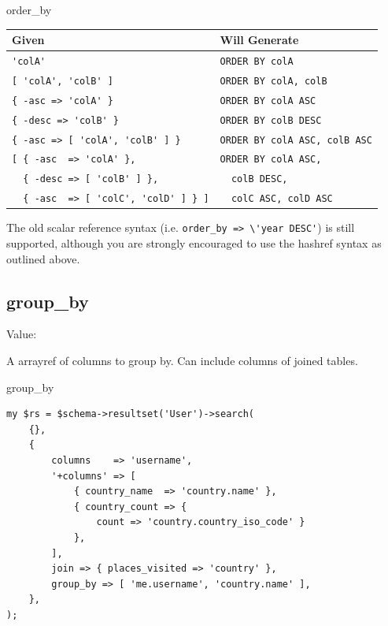 \begin{frame}[fragile]{order\_by}
\begin{table}
\begin{tabular}{l | l}
Given & Will Generate \\
\hline
\footnotesize{\verb|'colA'|                         } & \footnotesize{\verb|ORDER BY colA|              } \\
\footnotesize{\verb|[ 'colA', 'colB' ]|             } & \footnotesize{\verb|ORDER BY colA, colB|        } \\
\footnotesize{\verb|{ -asc => 'colA' }|             } & \footnotesize{\verb|ORDER BY colA ASC|          } \\
\footnotesize{\verb|{ -desc => 'colB' }|            } & \footnotesize{\verb|ORDER BY colB DESC|         } \\
\footnotesize{\verb|{ -asc => [ 'colA', 'colB' ] }| } & \footnotesize{\verb|ORDER BY colA ASC, colB ASC|} \\
\footnotesize{\verb|[ { -asc  => 'colA' },|           } &   \footnotesize{\verb|ORDER BY colA ASC,|        } \\
\footnotesize{\verb|  { -desc => [ 'colB' ] },|       } &   \footnotesize{\verb|  colB DESC,|              } \\
\footnotesize{\verb|  { -asc  => [ 'colC', 'colD' ] } ]|} & \footnotesize{\verb|  colC ASC, colD ASC|      } \\
\end{tabular}
\end{table}
\end{frame}

The old scalar reference syntax (i.e. \verb|order_by => \'year DESC'|) is
still supported, although you are strongly encouraged to use the hashref
syntax as outlined above.

\subsection{group\_by}

Value: \@columns

A arrayref of columns to group by. Can include columns of joined tables.

\begin{frame}[fragile]{group\_by}
\begin{lstlisting}
my $rs = $schema->resultset('User')->search(
    {},
    {
        columns    => 'username',
        '+columns' => [ 
            { country_name  => 'country.name' },
            { country_count => {
                count => 'country.country_iso_code' }
            },
        ],
        join => { places_visited => 'country' },
        group_by => [ 'me.username', 'country.name' ],
    },
);
\end{lstlisting}
\end{frame}

